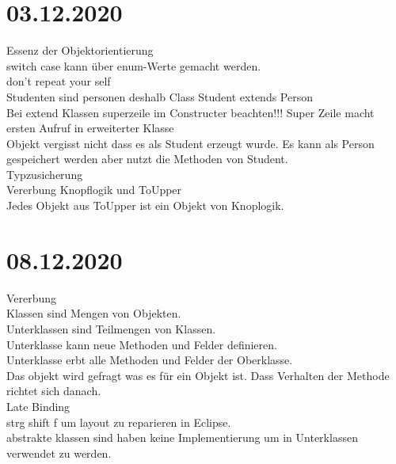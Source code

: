 \documentclass{article}
\begin{document}
	\section*{03.12.2020}
	Essenz der Objektorientierung \\
	switch case kann über enum-Werte gemacht werden. \\
	don't repeat your self \\
	Studenten sind personen deshalb Class Student extends Person \\
	Bei extend Klassen superzeile im Constructer beachten!!!
	Super Zeile macht ersten Aufruf in erweiterter Klasse \\
	Objekt vergisst nicht dass es als Student erzeugt wurde. Es kann als Person gespeichert werden aber nutzt die Methoden von Student. \\
	Typzusicherung \\
	Vererbung Knopflogik und ToUpper \\
	Jedes Objekt aus ToUpper ist ein Objekt von Knoplogik. \\
	\section*{08.12.2020}
	Vererbung \\
	Klassen sind Mengen von Objekten. \\
	Unterklassen sind Teilmengen von Klassen. \\
	Unterklasse kann neue Methoden und Felder definieren. \\
	Unterklasse erbt alle Methoden und Felder der Oberklasse. \\
	Das objekt wird gefragt was es für ein Objekt ist. Dass Verhalten der Methode richtet sich danach. \\
	Late Binding \\
	strg shift f um layout zu reparieren in Eclipse. \\
	abstrakte klassen sind haben keine Implementierung um in Unterklassen verwendet zu werden.
\end{document}
